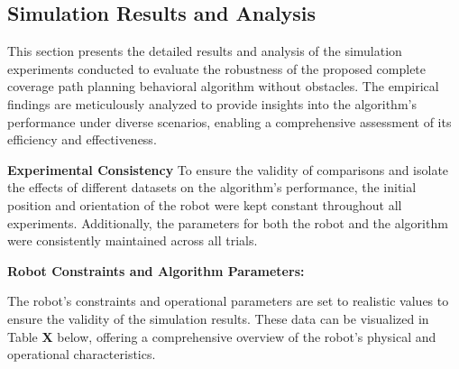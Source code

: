 
\subsection{Simulation Results and Analysis}

This section presents the detailed results and analysis of the simulation experiments conducted to evaluate the robustness of the proposed complete coverage path planning behavioral algorithm without obstacles. The empirical findings are meticulously analyzed to provide insights into the algorithm's performance under diverse scenarios, enabling a comprehensive assessment of its efficiency and effectiveness. 

\vspace*{6mm}  

\textbf{Experimental Consistency}
To ensure the validity of comparisons and isolate the effects of different datasets on the algorithm's performance, the initial position and orientation of the robot were kept constant throughout all experiments. Additionally, the parameters for both the robot and the algorithm were consistently maintained across all trials.


\vspace*{6mm}  

\textbf{Robot Constraints and Algorithm Parameters: } 


The robot's constraints and operational parameters are set to realistic values to ensure the validity of the simulation results. These data can be visualized in Table \textbf{X} below, offering a comprehensive overview of the robot's physical and operational characteristics.


